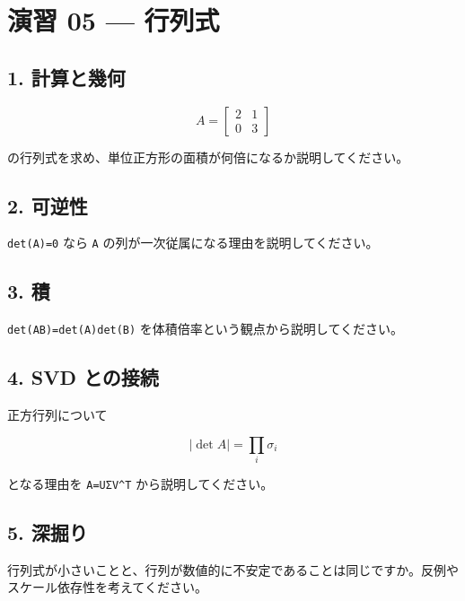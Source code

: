 \documentclass[
  11pt,
  a4paper,
]{ltjsarticle}
\author{}
\date{}
\begin{document}
\hypertarget{ux6f14ux7fd2-05-ux884cux5217ux5f0f}{%
\section{演習 05 --- 行列式}\label{ux6f14ux7fd2-05-ux884cux5217ux5f0f}}

\hypertarget{ux8a08ux7b97ux3068ux5e7eux4f55}{%
\subsection{1. 計算と幾何}\label{ux8a08ux7b97ux3068ux5e7eux4f55}}

\[
A=\begin{bmatrix}2&1\\0&3\end{bmatrix}
\]

の行列式を求め、単位正方形の面積が何倍になるか説明してください。

\hypertarget{ux53efux9006ux6027}{%
\subsection{2. 可逆性}\label{ux53efux9006ux6027}}

\texttt{det(A)=0} なら \texttt{A}
の列が一次従属になる理由を説明してください。

\hypertarget{ux7a4d}{%
\subsection{3. 積}\label{ux7a4d}}

\texttt{det(AB)=det(A)det(B)} を体積倍率という観点から説明してください。

\hypertarget{svd-ux3068ux306eux63a5ux7d9a}{%
\subsection{4. SVD との接続}\label{svd-ux3068ux306eux63a5ux7d9a}}

正方行列について

\[
|\det A|=\prod_i\sigma_i
\]

となる理由を \texttt{A=UΣV\^{}T} から説明してください。

\hypertarget{ux6df1ux6398ux308a}{%
\subsection{5. 深掘り}\label{ux6df1ux6398ux308a}}

行列式が小さいことと、行列が数値的に不安定であることは同じですか。反例やスケール依存性を考えてください。
\end{document}
